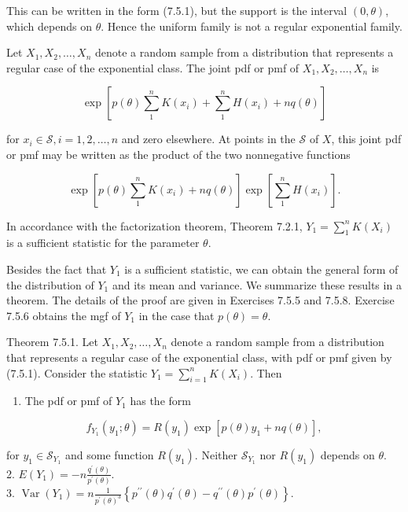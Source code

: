 This can be written in the form (7.5.1), but the support is the interval $(0, \theta)$, which depends on $\theta$. Hence the uniform family is not a regular exponential family.

Let $X_{1}, X_{2}, \ldots, X_{n}$ denote a random sample from a distribution that represents a regular case of the exponential class. The joint pdf or pmf of $X_{1}, X_{2}, \ldots, X_{n}$ is

$$
\exp \left[p(\theta) \sum_{1}^{n} K\left(x_{i}\right)+\sum_{1}^{n} H\left(x_{i}\right)+n q(\theta)\right]
$$

for $x_{i} \in \mathcal{S}, i=1,2, \ldots, n$ and zero elsewhere. At points in the $\mathcal{S}$ of $X$, this joint pdf or pmf may be written as the product of the two nonnegative functions

$$
\exp \left[p(\theta) \sum_{1}^{n} K\left(x_{i}\right)+n q(\theta)\right] \exp \left[\sum_{1}^{n} H\left(x_{i}\right)\right] .
$$

In accordance with the factorization theorem, Theorem 7.2.1, $Y_{1}=\sum_{1}^{n} K\left(X_{i}\right)$ is a sufficient statistic for the parameter $\theta$.

Besides the fact that $Y_{1}$ is a sufficient statistic, we can obtain the general form of the distribution of $Y_{1}$ and its mean and variance. We summarize these results in a theorem. The details of the proof are given in Exercises 7.5.5 and 7.5.8. Exercise 7.5.6 obtains the mgf of $Y_{1}$ in the case that $p(\theta)=\theta$.

Theorem 7.5.1. Let $X_{1}, X_{2}, \ldots, X_{n}$ denote a random sample from a distribution that represents a regular case of the exponential class, with pdf or pmf given by (7.5.1). Consider the statistic $Y_{1}=\sum_{i=1}^{n} K\left(X_{i}\right)$. Then

\begin{enumerate}
  \item The pdf or pmf of $Y_{1}$ has the form
\end{enumerate}


\begin{equation*}
f_{Y_{1}}\left(y_{1} ; \theta\right)=R\left(y_{1}\right) \exp \left[p(\theta) y_{1}+n q(\theta)\right], \tag{7.5.2}
\end{equation*}


for $y_{1} \in \mathcal{S}_{Y_{1}}$ and some function $R\left(y_{1}\right)$. Neither $\mathcal{S}_{Y_{1}}$ nor $R\left(y_{1}\right)$ depends on $\theta$.\\
2. $E\left(Y_{1}\right)=-n \frac{q^{\prime}(\theta)}{p^{\prime}(\theta)}$.\\
3. $\operatorname{Var}\left(Y_{1}\right)=n \frac{1}{p^{\prime}(\theta)^{3}}\left\{p^{\prime \prime}(\theta) q^{\prime}(\theta)-q^{\prime \prime}(\theta) p^{\prime}(\theta)\right\}$.

